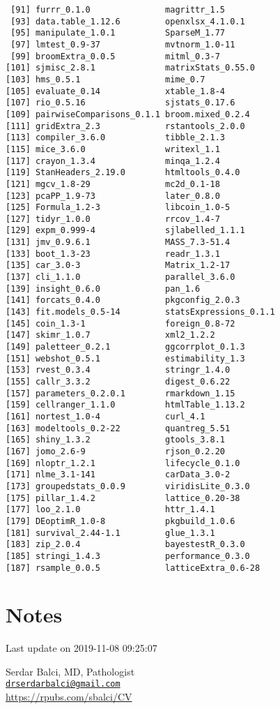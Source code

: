 \documentclass[]{article}
\begin{document}
\begin{verbatim}
 [91] furrr_0.1.0               magrittr_1.5             
 [93] data.table_1.12.6         openxlsx_4.1.0.1         
 [95] manipulate_1.0.1          SparseM_1.77             
 [97] lmtest_0.9-37             mvtnorm_1.0-11           
 [99] broomExtra_0.0.5          mitml_0.3-7              
[101] sjmisc_2.8.1              matrixStats_0.55.0       
[103] hms_0.5.1                 mime_0.7                 
[105] evaluate_0.14             xtable_1.8-4             
[107] rio_0.5.16                sjstats_0.17.6           
[109] pairwiseComparisons_0.1.1 broom.mixed_0.2.4        
[111] gridExtra_2.3             rstantools_2.0.0         
[113] compiler_3.6.0            tibble_2.1.3             
[115] mice_3.6.0                writexl_1.1              
[117] crayon_1.3.4              minqa_1.2.4              
[119] StanHeaders_2.19.0        htmltools_0.4.0          
[121] mgcv_1.8-29               mc2d_0.1-18              
[123] pcaPP_1.9-73              later_0.8.0              
[125] Formula_1.2-3             libcoin_1.0-5            
[127] tidyr_1.0.0               rrcov_1.4-7              
[129] expm_0.999-4              sjlabelled_1.1.1         
[131] jmv_0.9.6.1               MASS_7.3-51.4            
[133] boot_1.3-23               readr_1.3.1              
[135] car_3.0-3                 Matrix_1.2-17            
[137] cli_1.1.0                 parallel_3.6.0           
[139] insight_0.6.0             pan_1.6                  
[141] forcats_0.4.0             pkgconfig_2.0.3          
[143] fit.models_0.5-14         statsExpressions_0.1.1   
[145] coin_1.3-1                foreign_0.8-72           
[147] skimr_1.0.7               xml2_1.2.2               
[149] paletteer_0.2.1           ggcorrplot_0.1.3         
[151] webshot_0.5.1             estimability_1.3         
[153] rvest_0.3.4               stringr_1.4.0            
[155] callr_3.3.2               digest_0.6.22            
[157] parameters_0.2.0.1        rmarkdown_1.15           
[159] cellranger_1.1.0          htmlTable_1.13.2         
[161] nortest_1.0-4             curl_4.1                 
[163] modeltools_0.2-22         quantreg_5.51            
[165] shiny_1.3.2               gtools_3.8.1             
[167] jomo_2.6-9                rjson_0.2.20             
[169] nloptr_1.2.1              lifecycle_0.1.0          
[171] nlme_3.1-141              carData_3.0-2            
[173] groupedstats_0.0.9        viridisLite_0.3.0        
[175] pillar_1.4.2              lattice_0.20-38          
[177] loo_2.1.0                 httr_1.4.1               
[179] DEoptimR_1.0-8            pkgbuild_1.0.6           
[181] survival_2.44-1.1         glue_1.3.1               
[183] zip_2.0.4                 bayestestR_0.3.0         
[185] stringi_1.4.3             performance_0.3.0        
[187] rsample_0.0.5             latticeExtra_0.6-28      
\end{verbatim}

\pagebreak

\hypertarget{notes}{%
\section{Notes}\label{notes}}

Last update on 2019-11-08 09:25:07

Serdar Balci, MD, Pathologist\\
\href{mailto:drserdarbalci@gmail.com}{\nolinkurl{drserdarbalci@gmail.com}}\\
\url{https://rpubs.com/sbalci/CV}

\pagebreak

\newpage
\end{document}
